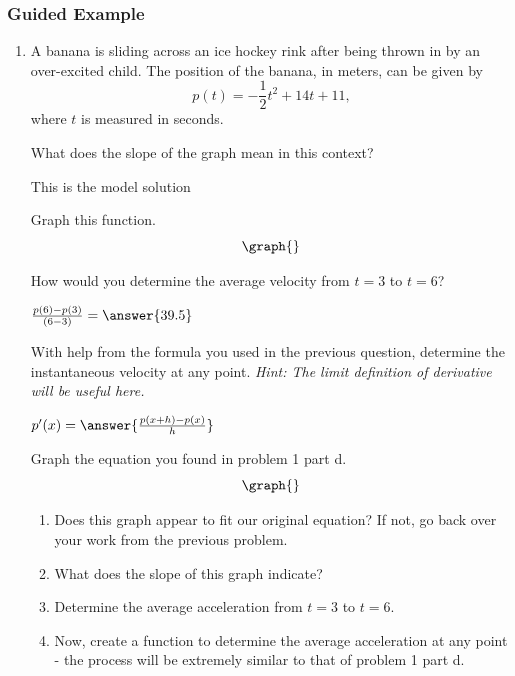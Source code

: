 \documentclass{ximera}
\begin{document}
\subsubsection{Guided Example}
\begin{enumerate}
\item {A banana is sliding across an ice hockey rink after being thrown in by an over-excited child. The position of the banana, in meters, can be given by $$p(t) = -\dfrac{1}{2}t^2+14t+11\text{,}$$ where $t$ is measured in seconds.}

\begin{question}
What does the slope of the graph mean in this context?
\begin{freeResponse}
This is the model solution %
\end{freeResponse}
\end{question}

\begin{question}
Graph this function.
\[
    \graph{}
\]
\end{question}

\begin{question}
How would you determine the average velocity from $t = 3$ to $t = 6$?

$ \frac{p(6)-p(3)}{(6-3)}  =  \answer{39.5}$
\end{question}

\begin{question}
With help from the formula you used in the previous question, determine the instantaneous velocity at any point. \textit{Hint: The limit definition of derivative will be useful here.}

$ p'(x) =  \answer{\frac{p(x+h)-p(x)}{h}}$
\end{question}

\begin{question}
Graph the equation you found in problem 1 part d.
\[
    \graph{}
\]
\end{question}

\begin{enumerate}
\item{Does this graph appear to fit our original equation? If not, go back over your work from the previous problem.}
\item{What does the slope of this graph indicate?}
\item{Determine the average acceleration from $t = 3$ to $t = 6$.}
\item{Now, create a function to determine the average acceleration at any point - the process will be extremely similar to that of problem 1 part d.}
\end{enumerate}
\end{enumerate}
\end{document}
